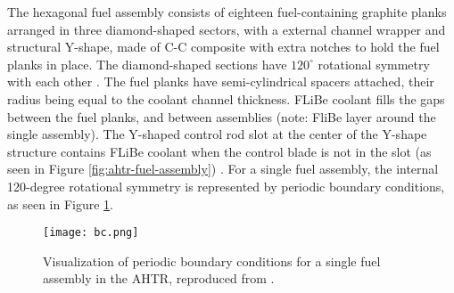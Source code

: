 The hexagonal fuel assembly consists of eighteen fuel-containing graphite planks 
arranged in three diamond-shaped sectors, with a external channel wrapper and 
structural Y-shape, made of C-C composite with extra notches to hold the fuel 
planks in place. 
The diamond-shaped sections have $120^\circ{}$ rotational symmetry with each other 
\cite{varma_ahtr_2012,ramey_monte_2018,noauthor_fluoride_nodate}. 
The fuel planks have semi-cylindrical spacers attached, their radius being 
equal to the coolant channel thickness. 
\gls{FLiBe} coolant fills the gaps between the fuel planks, and between 
assemblies (note: FliBe layer around the single assembly). 
The Y-shaped control rod slot at the center of the Y-shape structure contains 
\gls{FLiBe} coolant when the control blade is not in the slot (as seen in 
Figure \ref{fig:ahtr-fuel-assembly})
\cite{varma_ahtr_2012,ramey_monte_2018,noauthor_fluoride_nodate}.
For a single fuel assembly, the internal 120-degree rotational symmetry is 
represented by periodic boundary conditions, as seen in Figure \ref{fig:bc}. 
\begin{figure}[]
    \centering
    \texttt{[image: bc.png]} 
    \caption{Visualization of periodic boundary conditions for a single fuel 
    assembly in the \gls{AHTR}, reproduced from \cite{noauthor_fluoride_nodate}.}
    \label{fig:bc}
\end{figure}

